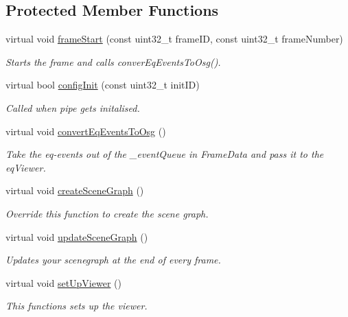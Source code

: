 \subsection*{Protected Member Functions}
\begin{CompactItemize}
\item 
virtual void \hyperlink{a00006_2e551fe08841da2b7a1def541656d48c}{frameStart} (const uint32\_\-t frameID, const uint32\_\-t frameNumber)
\begin{CompactList}\small\item\em Starts the frame and calls converEqEventsToOsg(). \item\end{CompactList}\item 
virtual bool \hyperlink{a00006_fcf11863d5370a815bd7e1216cc0f2e6}{configInit} (const uint32\_\-t initID)
\begin{CompactList}\small\item\em Called when pipe gets initalised. \item\end{CompactList}\item 
virtual void \hyperlink{a00006_16ff3017a9a333b3c7dd21b2032567c4}{convertEqEventsToOsg} ()
\begin{CompactList}\small\item\em Take the eq-events out of the \_\-eventQueue in FrameData and pass it to the eqViewer. \item\end{CompactList}\item 
virtual void \hyperlink{a00006_44e473d6aa40bdb24ae85f1dfd1f973d}{createSceneGraph} ()
\begin{CompactList}\small\item\em Override this function to create the scene graph. \item\end{CompactList}\item 
virtual void \hyperlink{a00006_5288fedad120ffd32f3290b4c91065b7}{updateSceneGraph} ()
\begin{CompactList}\small\item\em Updates your scenegraph at the end of every frame. \item\end{CompactList}\item 
virtual void \hyperlink{a00006_44ac49a7ba2b74a56b00177009d09c93}{setUpViewer} ()
\begin{CompactList}\small\item\em This functions sets up the viewer. \item\end{CompactList}\item 

\end{CompactItemize}
